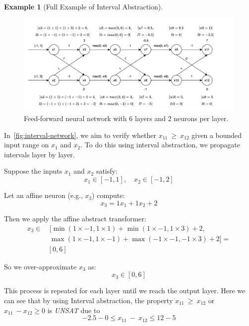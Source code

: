 \documentclass[oneside,11pt,dvipsnames]{book}
\numberwithin{equation}{section}
\theoremstyle{definition}
\newtheorem{example}{Example}[section]
\theoremstyle{remark}
\newcommand{\hd}[1]{\iftoggle{usecomment}{{\color{blue}{[HD]: #1}}}{}}
\begin{document}
\begin{example}[Full Example of Interval Abstraction]\label{ex:interval-abstraction}
\begin{figure}[h]
    \centering
    \includegraphics[width=1.2\linewidth]{figure/2_layers_example.png}
    \caption{Feed-forward neural network with 6 layers and 2 neurons per layer.}
    \label{fig:interval-network}
\end{figure}
In~\autoref{fig:interval-network}, we aim to verify whether \(x_{11}\ \geq\ x_{12}\) given a bounded input range on \(x_1\) and \(x_2\). To do this using interval abstraction, we propagate intervals layer by layer.

Suppose the inputs \(x_1\) and \(x_2\) satisfy:
\[
x_1 \in [-1, 1], \quad x_2 \in [-1, 2]
\]

Let an affine neuron (e.g., \(x_3\)) compute:
\[
x_3 = 1 x_1 + 1 x_2 + 2
\]

Then we apply the affine abstract transformer:
\begin{equation}
\begin{aligned}
  x_3 \in & ~[\min(1\times-1, 1\times1) + \min(1\times-1, 1\times3) + 2, \\
          & ~\max(1\times-1, 1\times-1) + \max(-1\times-1, -1\times3) + 2] = \\
          & [0,6]
\end{aligned}         
\end{equation}

So we over-approximate \(x_3\) as:
\[
x_3 \in [0, 6]
\]

This process is repeated for each layer until we reach the output layer.
Here we can see that by using Interval abstraction, the property \(x_{11}\ \geq\ x_{12}\) or  \(x_{11}\ - x_{12} \geq 0\) is \textit{UNSAT}\hd{seems incorrect} due to
\[
-2.5 - 0  \leq x_{11}\ -\ x_{12} \leq 12 - 5
\]
\end{example}
\end{document}
